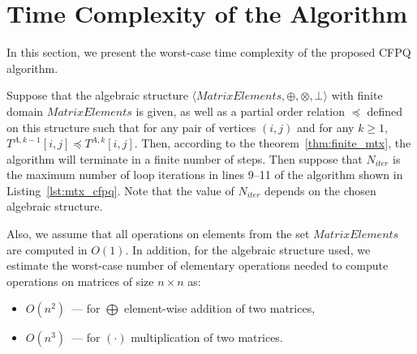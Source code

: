 \section{Time Complexity of the Algorithm}\label{sec:ch3/sect3}
In this section, we present the worst-case time complexity of the proposed CFPQ algorithm.

Suppose that the algebraic structure $\langle \textit{MatrixElements}, \oplus, \otimes, \bot \rangle$ with finite domain $\textit{MatrixElements}$ is given, as well as a partial order relation $\preceq$ defined on this structure such that for any pair of vertices $(i, j)$ and for any $k \geq 1$, $T^{A, k - 1}[i, j] \preceq T^{A, k}[i, j]$. Then, according to the theorem~\ref{thm:finite_mtx}, the algorithm will terminate in a finite number of steps. Then suppose that $N_{\textit{iter}}$ is the maximum number of loop iterations in lines 9--11 of the algorithm shown in Listing~\ref{lst:mtx_cfpq}. Note that the value of $N_{\textit{iter}}$ depends on the chosen algebraic structure.

Also, we assume that all operations on elements from the set $\textit{MatrixElements}$ are computed in $O(1)$. In addition, for the algebraic structure used, we estimate the worst-case number of elementary operations needed to compute operations on matrices of size $n \times n$ as:

\begin{itemize}
    \item $O(n^2)$~--- for $\bigoplus$ element-wise addition of two matrices,
    \item $O(n^3)$~--- for $(\cdot)$ multiplication of two matrices.
\end{itemize}

